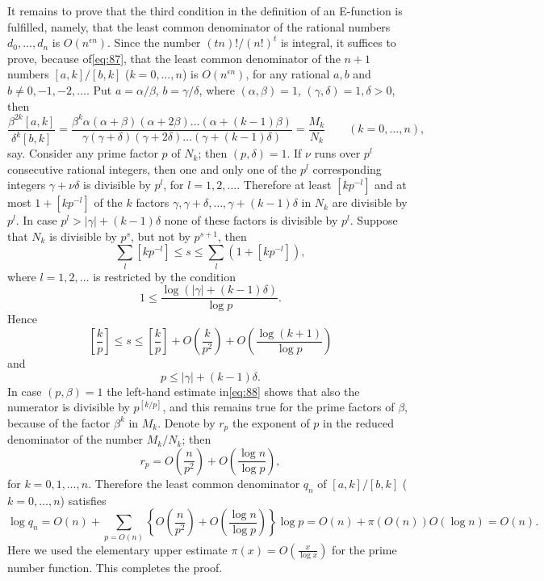 It remains to prove that the third condition in the definition of an E-function is fulfilled, namely, that the least common denominator of the rational numbers $d_0,\dots,d_n$ is $O(n^{\epsilon n})$. Since the number $(tn)!/(n!)^t$ is integral, it suffices to prove, because of\eqref{eq:87}, that the least common denominator of the $n+1$ numbers $[a,k] / [b,k]$ ($k=0,\dots,n$) is $O(n^{\epsilon n})$, for any rational $a,b$ and $b \neq 0,-1,-2,\dots$. Put $a=\alpha/\beta$, $b=\gamma/\delta$, where $(\alpha,\beta)=1$, $(\gamma,\delta)=1, \delta>0$, then
\[\frac{\beta^{2k}[a,k]}{\delta^{k}[b,k]} = \frac{\beta^{k}\alpha(\alpha+\beta) (\alpha+2\beta)\dots(\alpha+(k-1)\beta)}{\gamma(\gamma+\delta) (\gamma+2\delta)\dots(\gamma+(k-1)\delta)} = \frac{M_{k}}{N_{k}} \qquad (k=0,\dots,n),\]
say. Consider any prime factor $p$ of $N_k$; then $(p,\delta)=1$. If $\nu$ runs over $p^l$ consecutive rational integers, then one and only one of the $p^l$ corresponding integers $\gamma+\nu\delta$ is divisible by $p^l$, for $l=1,2,\dots$. Therefore at least $[kp^{-l}]$ and at most $1+[kp^{-l}]$ of the $k$ factors $\gamma,\gamma+\delta,\dots,\gamma+(k-1)\delta$ in $N_k$ are divisible by $p^l$. In case $p^l > |\gamma|+(k-1)\delta$ none of these factors is divisible by $p^l$. Suppose that $N_k$ is divisible by $p^s$, but not by $p^{s+1}$, then
\[\sum_{l} [kp^{-l}] \le s \le \sum_{l} (1+[kp^{-l}]),\]
where $l=1,2,\dots$ is restricted by the condition
\[1 \le \frac{\log (|\gamma| + (k-1)\delta)}{\log p}.\]
Hence
\begin{equation}
\left[\frac{k}{p}\right] \le s \le \left[\frac{k}{p}\right] + O\left(\frac{k}{p^{2}}\right) + O\left(\frac{\log(k+1)}{\log p}\right) \tag{88}\label{eq:88}
\end{equation}
and
\[p \le |\gamma| + (k-1)\delta.\]
In case $(p,\beta)=1$ the left-hand estimate in\eqref{eq:88} shows that also the numerator is divisible by $p^{[k/p]}$, and this remains true for the prime factors of $\beta$, because of the factor $\beta^k$ in $M_k$. Denote by $r_p$ the exponent of $p$ in the reduced denominator of the number $M_k/N_k$; then
\[r_{p} = O\left(\frac{n}{p^{2}}\right) + O\left(\frac{\log n}{\log p}\right),\]
for $k=0,1,\dots,n$. Therefore the least common denominator $q_n$ of $[a,k] / [b,k]$ ($k=0,\dots,n$) satisfies
\[\log q_n = O(n) + \sum_{p=O(n)} \left\{ O\left(\frac{n}{p^2}\right) + O\left(\frac{\log n}{\log p}\right) \right\} \log p = O(n) + \pi(O(n)) O(\log n) = O(n).\]
Here we used the elementary upper estimate $\pi(x) = O\left(\frac{x}{\log x}\right)$ for the prime number function. This completes the proof.

